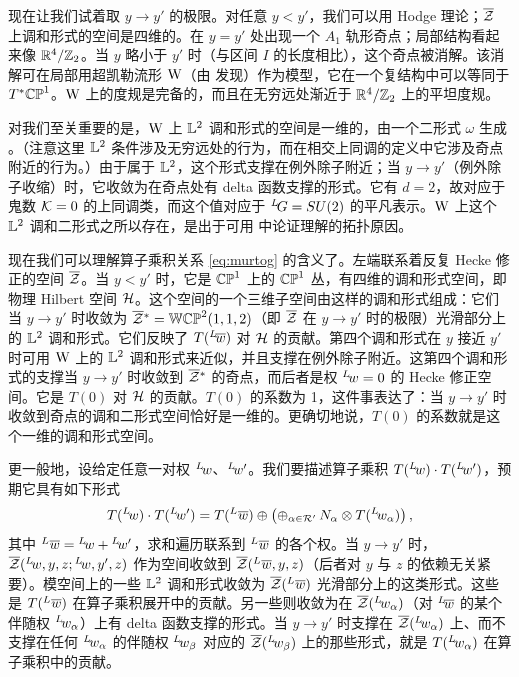 现在让我们试着取 $y\to y'$ 的极限。对任意 $y<y'$，我们可以用 Hodge 理论；$\bar\EUZ$ 上调和形式的空间是四维的。在 $y=y'$ 处出现一个 $A_1$ 轨形奇点；局部结构看起来像 $\Bbb{R}^4/\Bbb{Z}_2$。当 $y$ 略小于 $y'$ 时（与区间 $I$ 的长度相比），这个奇点被消解。该消解可在局部用超凯勒流形 $\EUWW$（由 \cite{ref130} 发现）作为模型，它在一个复结构中可以等同于 $T^*\Bbb{CP}^1$。$\EUWW$ 上的度规是完备的，而且在无穷远处渐近于 $\Bbb{R}^4/\Bbb{Z}_2$ 上的平坦度规。

对我们至关重要的是，$\EUWW$ 上 ${\Bbb{L}}^2$ 调和形式的空间是一维的，由一个二形式 $\omega$ 生成 \cite{ref130}。（注意这里 ${\Bbb{L}}^2$ 条件涉及无穷远处的行为，而在相交上同调的定义中它涉及奇点附近的行为。）由于属于 ${\Bbb{L}}^2$，这个形式支撑在例外除子附近；当 $y\to y'$（例外除子收缩）时，它收敛为在奇点处有 delta 函数支撑的形式。它有 $d=2$，故对应于鬼数 $\EUK=0$ 的上同调类，而这个值对应于 $^L\negthinspace G=SU(2)$ 的平凡表示。$\EUWW$ 上这个 ${\Bbb{L}}^2$ 调和二形式之所以存在，是出于可用 \cite{ref131} 中论证理解的拓扑原因。

现在我们可以理解算子乘积关系 \eqref{eq:murtog} 的含义了。左端联系着反复 Hecke 修正的空间 $\bar\EUZ$。当 $y<y'$ 时，它是 $\Bbb{CP}^1$ 上的 $\Bbb{CP}^1$ 丛，有四维的调和形式空间，即物理 Hilbert 空间 ${\cal H}$。这个空间的一个三维子空间由这样的调和形式组成：它们当 $y\to y'$ 时收敛为 $\bar\EUZ{}^*=\Bbb{WCP}^2(1,1,2)$（即 $\bar\EUZ$ 在 $y\to y'$ 时的极限）光滑部分上的 ${\Bbb{L}}^2$ 调和形式。它们反映了 $T({}^L\negthinspace\bar w)$ 对 ${\cal H}$ 的贡献。第四个调和形式在 $y$ 接近 $y'$ 时可用 $\EUWW$ 上的 $\Bbb{L}^2$ 调和形式来近似，并且支撑在例外除子附近。这第四个调和形式的支撑当 $y\to y'$ 时收敛到 $\bar\EUZ{}^*$ 的奇点，而后者是权 $^L\negthinspace w=0$ 的 Hecke 修正空间。它是 $T(0)$ 对 ${\cal H}$ 的贡献。$T(0)$ 的系数为 1，这件事表达了：当 $y\to y'$ 时收敛到奇点的调和二形式空间恰好是一维的。更确切地说，$T(0)$ 的系数就是这个一维的调和形式空间。

更一般地，设给定任意一对权 $^L\negthinspace w$、$^L\negthinspace w'$。我们要描述算子乘积 $T({}^L\negthinspace w)\cdot T({}^L\negthinspace w')$，预期它具有如下形式
\setcounter{equation}{31}
\begin{equation}\label{eq:mitory}
T({}^L\negthinspace w)\cdot T({}^L\negthinspace
w')=T({}^L\negthinspace\,\bar w)\oplus\left(\oplus_{\alpha\in \EUR'}\,N_\alpha
\otimes T({}^L\negthinspace w_\alpha)\right),
\end{equation}
 其中 $^L\negthinspace\,\bar w={}^L\negthinspace w+{}^L\negthinspace w'$，求和遍历联系到 $^L\negthinspace\,\bar w$ 的各个权。当 $y\to y'$ 时，$\bar\EUZ({}^L\negthinspace w,y,z;{}^L\negthinspace w,y',z)$ 作为空间收敛到 $\bar\EUZ({}^L\negthinspace\,\bar w,y,z)$（后者对 $y$ 与 $z$ 的依赖无关紧要）。模空间上的一些 ${\Bbb{L}}^2$ 调和形式收敛为 $\bar\EUZ({}^L\negthinspace\,\bar w)$ 光滑部分上的这类形式。这些是 $T({}^L\negthinspace\,\bar w)$ 在算子乘积展开中的贡献。另一些则收敛为在 $\bar\EUZ({}^L\negthinspace w_\alpha)$（对 $^L\negthinspace\bar w$ 的某个伴随权 $^L\negthinspace w_\alpha$）上有 delta 函数支撑的形式。当 $y\to y'$ 时支撑在 $\bar\EUZ({}^L\negthinspace w_\alpha)$ 上、而不支撑在任何 $^L\negthinspace w_\alpha$ 的伴随权 $^L\negthinspace w_\beta$ 对应的 $\bar\EUZ({}^L\negthinspace w_\beta)$ 上的那些形式，就是 $T({}^L\negthinspace w_\alpha)$ 在算子乘积中的贡献。

